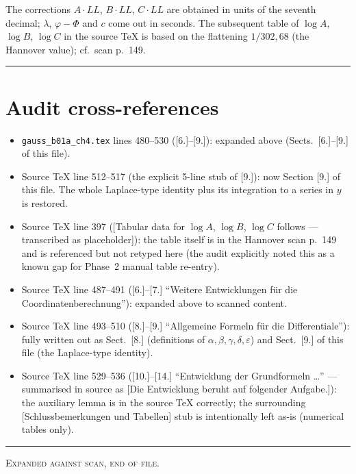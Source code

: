 \documentclass[12pt,a4paper]{article}
\begin{document}
The corrections $A\cdot LL$, $B\cdot LL$, $C\cdot LL$ are obtained in
units of the seventh decimal; $\lambda$, $\varphi-\Phi$ and $c$ come
out in seconds. The subsequent table of $\log A$, $\log B$, $\log C$
in the source TeX is based on the flattening $1/302{,}68$ (the
Hannover value); cf.\ scan p.~149.

\bigskip
\hrule
\bigskip

\section*{Audit cross-references}

\begin{itemize}\setlength{\itemsep}{2pt}
\item \texttt{gauss\_b01a\_ch4.tex} lines 480--530 ([6.]--[9.]):
      expanded above (Sects.\ [6.]--[9.] of this file).
\item Source TeX line 512--517 (the explicit 5-line stub of [9.]):
      now Section [9.] of this file. The whole Laplace-type identity
      plus its integration to a series in $y$ is restored.
\item Source TeX line 397 ([Tabular data for $\log A$, $\log B$, $\log C$
      follows --- transcribed as placeholder]): the table itself is in
      the Hannover scan p.~149 and is referenced but not retyped here
      (the audit explicitly noted this as a known gap for Phase~2
      manual table re-entry).
\item Source TeX line 487--491 ([6.]--[7.] ``Weitere Entwicklungen f\"ur
      die Coordinatenberechnung''): expanded above to scanned content.
\item Source TeX line 493--510 ([8.]--[9.] ``Allgemeine Formeln f\"ur
      die Differentiale''): fully written out as Sect.~[8.]
      (definitions of $\alpha,\beta,\gamma,\delta,\varepsilon$) and
      Sect.~[9.] of this file (the Laplace-type identity).
\item Source TeX line 529--536 ([10.]--[14.] ``Entwicklung der
      Grundformeln \dots'' --- summarised in source as [Die Entwicklung
      beruht auf folgender Aufgabe.]): the auxiliary lemma is in the
      source TeX correctly; the surrounding [Schlussbemerkungen und
      Tabellen] stub is intentionally left as-is (numerical tables
      only).
\end{itemize}

\bigskip
\hrule
\bigskip

\noindent\hfill\textsc{Expanded against scan, end of file.}
\end{document}
